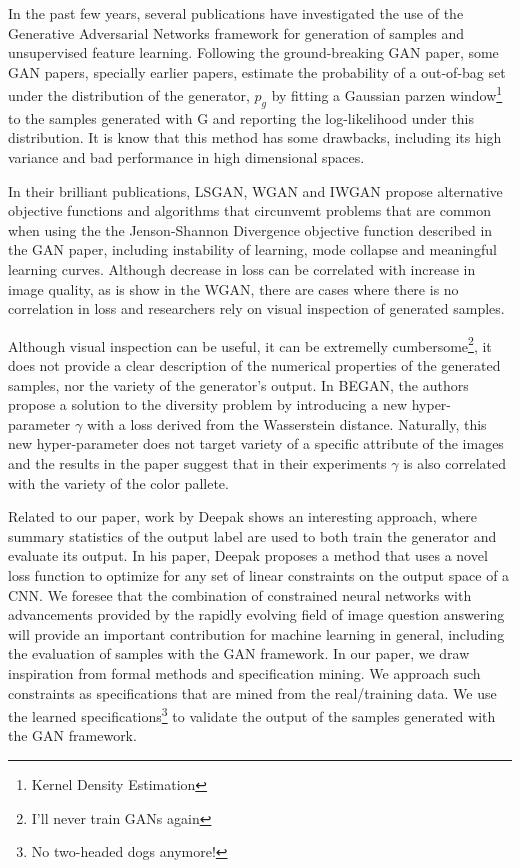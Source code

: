 In the past few years, several publications have investigated the use of the
Generative Adversarial Networks framework for generation of samples and
unsupervised feature learning. Following the ground-breaking GAN paper, some GAN
papers, specially earlier papers, estimate the probability of a
out-of-bag set under the distribution of the generator, $p_g$ by fitting a
Gaussian parzen window\footnote{Kernel Density Estimation} to the samples generated 
with G and reporting the log-likelihood under this distribution. It is know that
this method has some drawbacks, including its high variance and bad performance
in high dimensional spaces. 

In their brilliant publications, LSGAN, WGAN and IWGAN propose alternative
objective functions and algorithms that circunvemt problems that are common when using the
the Jenson-Shannon Divergence objective function described in the GAN paper, including instability of
learning, mode collapse and meaningful learning curves. Although decrease in
loss can be correlated with increase in image quality, as is show in the WGAN,
there are cases where there is no correlation in loss and researchers rely on
visual inspection of generated samples.

Although visual inspection can be useful, it can be extremelly
cumbersome\footnote{I'll never train GANs again}, it does not provide a clear
description of the numerical properties of the generated samples, nor the
variety of the generator's output. In BEGAN, the authors propose a solution to
the diversity problem by introducing a new hyper-parameter $\gamma$ with a loss
derived from the Wasserstein distance. Naturally, this new hyper-parameter does
not target variety of a specific attribute of the images and the results in the
paper suggest that in their experiments $\gamma$ is also correlated with the variety
of the color pallete.  

Related to our paper, work by Deepak shows an interesting approach, where summary 
statistics of the output label are used to both train the generator and evaluate its output. 
In his paper, Deepak proposes a method that uses a novel loss function to
optimize for any set of linear constraints on the output space of a CNN. We foresee that the
combination of constrained neural networks with advancements provided by the 
rapidly evolving field of image question answering will provide an important
contribution for machine learning in general, including the evaluation of
samples with the GAN framework. 
In our paper, we draw inspiration from formal methods and specification mining.
We approach such constraints as specifications that are mined from the
real/training data. We use the learned specifications\footnote{No two-headed
dogs anymore!} to validate the output of the samples generated with the GAN framework.
